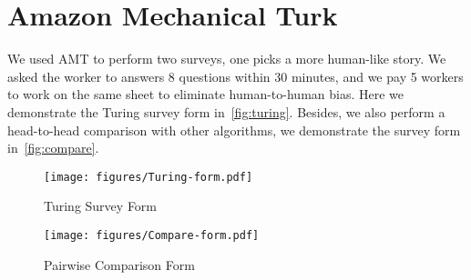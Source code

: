 \documentclass[11pt,a4paper]{article}
\begin{document}
\section{Amazon Mechanical Turk}
We used AMT to perform two surveys, one picks a more human-like story. We asked the worker to answers 8 questions within 30 minutes, and we pay 5 workers to work on the same sheet to eliminate human-to-human bias. Here we demonstrate the Turing survey form in~\autoref{fig:turing}. Besides, we also perform a head-to-head comparison with other algorithms, we demonstrate the survey form in~\autoref{fig:compare}.

\begin{figure*}\centering
\texttt{[image: figures/Turing-form.pdf]}      
\caption{Turing Survey Form}
\label{fig:turing}
\end{figure*}

\begin{figure*}[!thb]
\centering
\texttt{[image: figures/Compare-form.pdf]}      
\caption{Pairwise Comparison Form}
\label{fig:compare}
\end{figure*}
\end{document}
